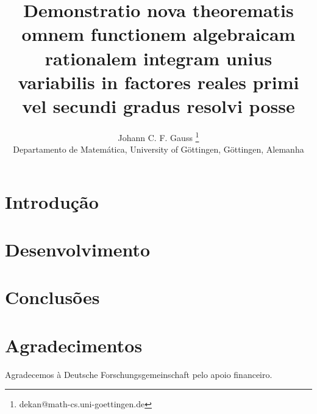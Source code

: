 \documentclass[a4]{report}
\begin{document}
\title{Demonstratio nova theorematis omnem functionem algebraicam rationalem integram unius variabilis in factores reales primi vel secundi gradus resolvi posse}

\author{
 {\large  Johann C. F. Gauss }\thanks{dekan@math-cs.uni-goettingen.de}\\
 {\small Departamento de Matemática, University of Göttingen, Göttingen, Alemanha} \\
 }

\criartitulo


\section{ Introdução }

\lipsum[2-3]

\section{Desenvolvimento}

\lipsum[5-8]

\section{Conclusões}
\lipsum[15]

\section*{Agradecimentos}
Agradecemos à Deutsche Forschungsgemeinschaft pelo apoio financeiro.

\end{document}
